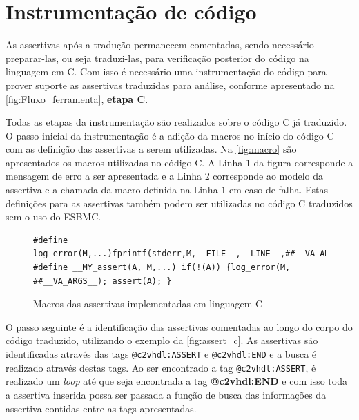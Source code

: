 \section{Instrumentação de código}

\par
As assertivas após a tradução permanecem comentadas, sendo necessário preparar-las, ou seja traduzi-las, para verificação posterior do código na linguagem em C. Com isso é necessário uma instrumentação do código para prover suporte as assertivas traduzidas para análise, conforme apresentado na \autoref{fig:Fluxo_ferramenta}, \textbf{etapa C}.

\par
Todas as etapas da instrumentação são realizados sobre o código C já traduzido. O passo inicial da instrumentação é a adição da macros no início do código C com as definição das assertivas a serem utilizadas. Na \autoref{fig:macro} são apresentados os macros utilizadas no código C. A Linha $1$ da figura corresponde a mensagem de erro a ser apresentada e a Linha $2$ corresponde ao modelo da assertiva e a chamada da macro definida na Linha $1$ em caso de falha. Estas definições para as assertivas também podem ser utilizadas no código C traduzidos sem o uso do ESBMC.


\begin{figure}[H]
\caption{\label{fig:macro} Macros das assertivas implementadas em linguagem C}
	\begin{center}
    \begin{minipage}{0.99\textwidth}
    \begin{lstlisting}       
#define log_error(M,...)fprintf(stderr,M,__FILE__,__LINE__,##__VA_ARGS__)
#define __MY_assert(A, M,...) if(!(A)) {log_error(M, ##__VA_ARGS__); assert(A); }
    \end{lstlisting}
    \end{minipage}
	\end{center}
\end{figure}

\par
O passo seguinte é a identificação das assertivas comentadas ao longo do corpo do código traduzido, utilizando o exemplo da \autoref{fig:assert_c}. As assertivas são identificadas através das tags \texttt{@c2vhdl:ASSERT} e \texttt{@c2vhdl:END} e a busca é realizado através destas tags. Ao ser encontrado a tag \texttt{@c2vhdl:ASSERT}, é realizado um \textit{loop} até que seja encontrada a tag \textbf{@c2vhdl:END} e com isso toda a assertiva inserida possa ser passada a função de busca das informações da assertiva contidas entre as tags apresentadas.

